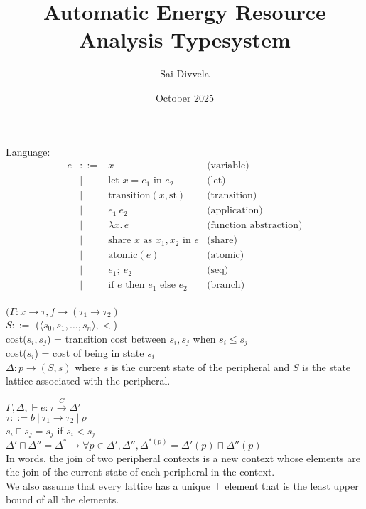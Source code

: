 \documentclass{article}
\title{Automatic Energy Resource Analysis Typesystem}
\author{Sai Divvela}
\date{October 2025}
\begin{document}
Language:
\[
\begin{array}{rcll}
e & ::= & x & \text{(variable)} \\
  & \mid & \text{let } x = e_1 \text{ in } e_2 & \text{(let)} \\
  & \mid & \text{transition}(x, \text{st}) & \text{(transition)} \\
  & \mid & e_1\ e_2 & \text{(application)} \\
  & \mid & \lambda x.\,e & \text{(function abstraction)} \\
  & \mid & \text{share } x \text{ as } x_1, x_2 \text{ in } e & \text{(share)} \\
  & \mid & \text{atomic}(e) & \text{(atomic)} \\
  & \mid & e_1;\ e_2 & \text{(seq)} \\
  & \mid & \text{if } e \text{ then } e_1 \text{ else } e_2 & \text{(branch)}
\end{array}
\]
\\

$(\Gamma:x \rightarrow \tau,f \rightarrow \left( \tau_{1} \rightarrow \tau_{2} \right)$\\
\(S ::=\) (\(\langle s_{0},s_{1},\ldots,s_{n}\rangle, <\))\\
cost(\(s_{i},s_{j}\)) = transition cost between \(s_{i},s_{j}\) when
\(s_{i} \leq s_{j}\)\\
cost(\(s_{i}\)) = cost of being in state \(s_{i}\)\\
\(\Delta:p \rightarrow (S,s)\) where \(s\) is the current state of the
peripheral and \(S\) is the state lattice associated with the
peripheral.

\(\Gamma,\Delta, \vdash e:\tau\overset{C}{\rightarrow}\Delta'\)\\
\(\tau ::= b~|~\tau_{1} \rightarrow \tau_{2}~|~\rho\)\\
\(s_{i} \sqcap s_{j} = s_{j}\) if \(s_{i} < s_{j}\)\\
\(\Delta' \sqcap \Delta'' = \Delta^{\ast} \rightarrow \forall p \in \Delta',\Delta'',\Delta^{\ast (p)} = \Delta'(p) \sqcap \Delta''(p)\)\\
In words, the join of two peripheral contexts is a new context whose
elements are the join of the current state of each peripheral in the
context.\\
We also assume that every lattice has a unique \(\top\) element that is
the least upper bound of all the elements.
\end{document}
